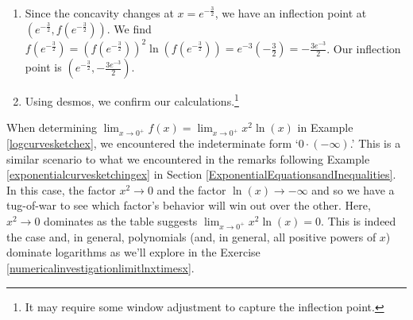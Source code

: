 \documentclass{ximera}
\begin{document}
\begin{example}
\begin{explanation}
\begin{enumerate}
\begin{image}
\end{image}

Hence, the graph of $f$ is concave down on $\left(0, e^{-\frac{3}{2}} \right)$ and concave up on $\left(e^{-\frac{3}{2}} , \infty \right)$.


\item  Since the concavity changes at $x = e^{-\frac{3}{2}}$, we have an inflection point at $\left( e^{-\frac{3}{2}}, f \left(e^{-\frac{3}{2}}\right) \right)$.  We find $f \left(e^{-\frac{3}{2}}\right)  = \left(f \left(e^{-\frac{3}{2}}\right) \right)^2 \ln \left(f \left(e^{-\frac{3}{2}}\right) \right) = e^{-3} \left(-\frac{3}{2} \right) = -\frac{3e^{-3}}{2}$.  Our inflection point is $\left( e^{-\frac{3}{2}},  -\frac{3e^{-3}}{2} \right)$.

\item  Using desmos, we confirm our calculations.\footnote{It may require some window adjustment to capture the inflection point.}

\begin{center}
\end{center}



\end{enumerate}
\end{explanation}
\end{example}

When determining $\lim_{x \rightarrow 0^{+}} f(x)  = \lim_{x \rightarrow 0^{+}} x^2 \ln(x)$ in Example \ref{logcurvesketchex}, we encountered the indeterminate form `$0 \cdot (-\infty)$.'  This is a similar scenario to what we encountered in the remarks following Example \ref{exponentialcurvesketchingex} in Section \ref{ExponentialEquationsandInequalities}.  In this case, the factor $x^2 \rightarrow 0$ and the factor $\ln(x) \rightarrow -\infty$ and so we have a tug-of-war to see which factor's behavior will win out over the other.  Here, $x^2 \rightarrow 0$ dominates as the table suggests $\lim_{x \rightarrow 0^{+}} x^2 \ln(x) = 0$.  This is indeed the case and, in general, polynomials (and, in general, all positive powers of $x$) dominate logarithms as we'll explore in the Exercise \ref{numericalinvestigationlimitlnxtimesx}.  



\closegraphsfile
\end{document}

